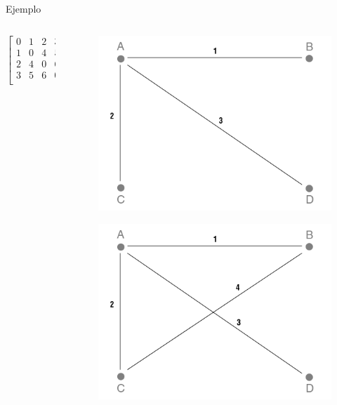 \begin{frame}{Ejemplo}
\begin{columns}
\begin{column}{5cm}
	\[
	\begin{bmatrix}
	    0 & 1 & 2 & 3\\
	    1 & 0 & 4 & 5\\
	    2 & 4 & 0 & 6\\
	    3 & 5 & 6 & 0\\
	\end{bmatrix}
	\]
\end{column}

\begin{column}{7cm}
	\begin{figure}[H]
    		\includegraphics[scale=0.25]{./Imagenes/ej.png}
	\end{figure}
	
	\begin{figure}[H]
	    		\includegraphics[scale=0.25]{./Imagenes/ej_mejorado.png}
	\end{figure}
\end{column}
\end{columns}
\end{frame}


